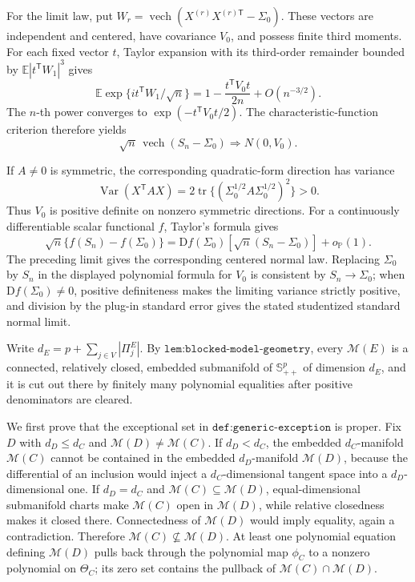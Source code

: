 For the limit law, put \(W_r=\operatorname{vech}(X^{(r)}X^{(r)\mathsf T}-\Sigma_0)\). These vectors are independent and centered, have covariance \(V_0\), and possess finite third moments. For each fixed vector \(t\), Taylor expansion with its third-order remainder bounded by \(\mathbb E|t^{\mathsf T}W_1|^3\) gives
\[
 \mathbb E\exp\{it^{\mathsf T}W_1/\sqrt n\}
 =1-\frac{t^{\mathsf T}V_0t}{2n}+O(n^{-3/2}).
\]
The \(n\)-th power converges to \(\exp(-t^{\mathsf T}V_0t/2)\). The characteristic-function criterion therefore yields
\[
 \sqrt n\,\operatorname{vech}(S_n-\Sigma_0)\Longrightarrow N(0,V_0).
\]

If \(A\neq0\) is symmetric, the corresponding quadratic-form direction has variance
\[
 \operatorname{Var}(X^{\mathsf T}AX)
 =2\operatorname{tr}\{(\Sigma_0^{1/2}A\Sigma_0^{1/2})^2\}>0.
\]
Thus \(V_0\) is positive definite on nonzero symmetric directions. For a continuously differentiable scalar functional \(f\), Taylor's formula gives
\[
 \sqrt n\{f(S_n)-f(\Sigma_0)\}
 =\mathrm Df(\Sigma_0)[\sqrt n(S_n-\Sigma_0)]+o_{\mathbb P}(1).
\]
The preceding limit gives the corresponding centered normal law. Replacing \(\Sigma_0\) by \(S_n\) in the displayed polynomial formula for \(V_0\) is consistent by \(S_n\to\Sigma_0\); when \(\mathrm Df(\Sigma_0)\neq0\), positive definiteness makes the limiting variance strictly positive, and division by the plug-in standard error gives the stated studentized standard normal limit.

Write \(d_E=p+\sum_{j\in V}|\Pi^E_j|\). By \(\texttt{lem:blocked-model-geometry}\), every \(\mathcal M(E)\) is a connected, relatively closed, embedded submanifold of \(\mathbb S^p_{++}\) of dimension \(d_E\), and it is cut out there by finitely many polynomial equalities after positive denominators are cleared.

We first prove that the exceptional set in \(\texttt{def:generic-exception}\) is proper. Fix \(D\) with \(d_D\leq d_C\) and \(\mathcal M(D)\neq\mathcal M(C)\). If \(d_D<d_C\), the embedded \(d_C\)-manifold \(\mathcal M(C)\) cannot be contained in the embedded \(d_D\)-manifold \(\mathcal M(D)\), because the differential of an inclusion would inject a \(d_C\)-dimensional tangent space into a \(d_D\)-dimensional one. If \(d_D=d_C\) and \(\mathcal M(C)\subseteq\mathcal M(D)\), equal-dimensional submanifold charts make \(\mathcal M(C)\) open in \(\mathcal M(D)\), while relative closedness makes it closed there. Connectedness of \(\mathcal M(D)\) would imply equality, again a contradiction. Therefore \(\mathcal M(C)\nsubseteq\mathcal M(D)\). At least one polynomial equation defining \(\mathcal M(D)\) pulls back through the polynomial map \(\phi_C\) to a nonzero polynomial on \(\Theta_C\); its zero set contains the pullback of \(\mathcal M(C)\cap\mathcal M(D)\).

